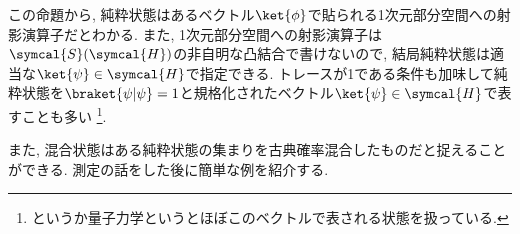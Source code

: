 この命題から, 純粋状態はあるベクトル$\ket{\phi}$で貼られる1次元部分空間への射影演算子だとわかる. 
また, 1次元部分空間への射影演算子は$\symcal{S}(\symcal{H})$の非自明な凸結合で書けないので, 結局純粋状態は適当な$\ket{\psi}\in\symcal{H}$で指定できる. 
トレースが1である条件も加味して純粋状態を$\braket{\psi|\psi}=1$と規格化されたベクトル$\ket{\psi}\in\symcal{H}$で表すことも多い
\footnote{というか量子力学というとほぼこのベクトルで表される状態を扱っている. }. 

また, 混合状態はある純粋状態の集まりを古典確率混合したものだと捉えることができる. 
測定の話をした後に簡単な例を紹介する. 





